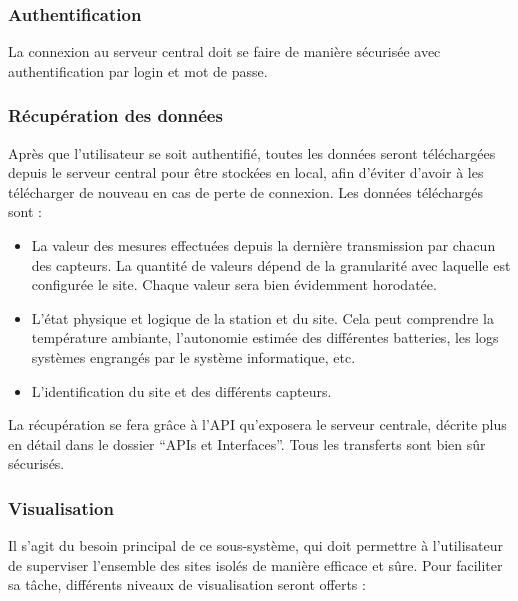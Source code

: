 \subsubsection{Authentification}

La connexion au serveur central doit se faire de manière sécurisée avec authentification par login et mot de passe.

\subsubsection{Récupération des données}

Après que l'utilisateur se soit authentifié, toutes les données seront téléchargées depuis le serveur central pour être stockées en local, afin d'éviter d'avoir à les télécharger de nouveau en cas de perte de connexion. Les données téléchargés sont :

\begin{itemize}
\item La valeur des mesures effectuées depuis la dernière transmission par chacun des capteurs. La quantité de valeurs dépend de la granularité avec laquelle est configurée le site. Chaque valeur sera bien évidemment horodatée.
\item L'état physique et logique de la station et du site. Cela peut comprendre la température ambiante, l'autonomie estimée des différentes batteries, les logs systèmes engrangés par le système informatique, etc.
\item L'identification du site et des différents capteurs. %
\end{itemize}

La récupération se fera grâce à l'API qu'exposera le serveur centrale, décrite plus en détail dans le dossier ``APIs et Interfaces''. Tous les transferts sont bien sûr sécurisés.

\subsubsection{Visualisation}

Il s'agit du besoin principal de ce sous-système, qui doit permettre à l'utilisateur de superviser l'ensemble des sites isolés de manière efficace et sûre. Pour faciliter sa tâche, différents niveaux de visualisation seront offerts :

